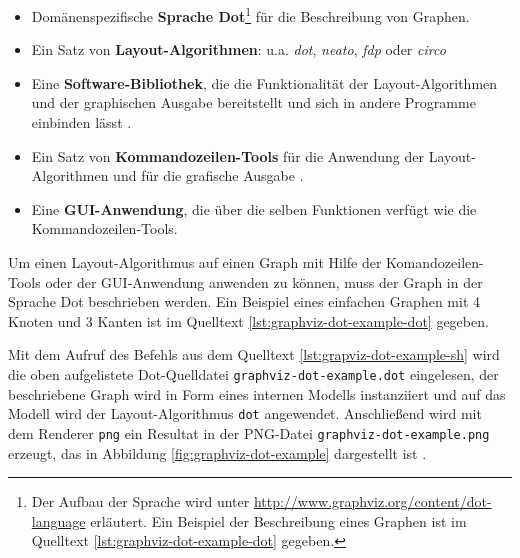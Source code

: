 \begin{itemize}
    \item Domänenspezifische \textbf{Sprache Dot}\footnote{Der Aufbau der Sprache wird unter \url{http://www.graphviz.org/content/dot-language} erläutert. Ein Beispiel der Beschreibung eines Graphen ist im Quelltext \ref{lst:graphviz-dot-example-dot} gegeben.} für die Beschreibung von Graphen.
    \item Ein Satz von \textbf{Layout-Algorithmen}: u.a. \textit{dot}, \textit{neato}, \textit{fdp} oder \textit{circo} \cite{Gansner14Using, NorthGansner14Dot-Manual}
    \item Eine \textbf{Software-Bibliothek}, die die Funktionalität der Layout-Algorithmen und der graphischen Ausgabe bereitstellt und sich in andere Programme einbinden lässt \cite{Gansner14Using}.
    \item Ein Satz von \textbf{Kommandozeilen-Tools} für die Anwendung der Layout-Algorithmen und für die grafische Ausgabe \cite{NorthGansner14Dot-Manual}.
    \item Eine \textbf{GUI-Anwendung}, die über die selben Funktionen verfügt wie die Kommandozeilen-Tools.
\end{itemize}


Um einen Layout-Algorithmus auf einen Graph mit Hilfe der Komandozeilen-Tools oder der GUI-Anwendung anwenden zu können, muss der Graph in der Sprache Dot beschrieben werden. Ein Beispiel eines einfachen Graphen mit 4 Knoten und 3 Kanten ist im Quelltext \ref{lst:graphviz-dot-example-dot} gegeben.



Mit dem Aufruf des Befehls aus dem Quelltext \ref{lst:grapviz-dot-example-sh} wird die oben aufgelistete Dot-Quelldatei \lstinline{graphviz-dot-example.dot} eingelesen, der beschriebene Graph wird in Form eines internen Modells instanziiert und auf das Modell wird der Layout-Algorithmus \lstinline{dot} angewendet. Anschließend wird mit dem Renderer \lstinline{png} ein Resultat in der PNG-Datei \lstinline{graphviz-dot-example.png} erzeugt, das in Abbildung \ref{fig:graphviz-dot-example} dargestellt ist \cite{Gansner14Using}.




